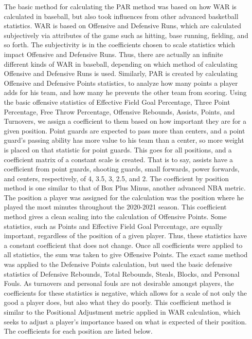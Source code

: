 \documentclass[12pt, titlepage]{article}
\begin{document}
The basic method for calculating the PAR method was based on how WAR is calculated in baseball, but 
also took influences from other advanced basketball statistics. WAR is based on Offensive and Defensive 
Runs, which are calculated subjectively via attributes of the game such as hitting, base running, fielding, 
and so forth. The subjectivity is in the coefficients chosen to scale statistics which impact Offensive and 
Defensive Runs. Thus, there are actually an infinite different kinds of WAR in baseball, depending on which 
method of calculating Offensive and Defensive Runs is used. Similarly, PAR is created by calculating 
Offensive and Defensive Points statistics, to analyze how many points a player adds for his team, and how 
many he prevents the other team from scoring. Using the basic offensive statistics of Effective Field Goal 
Percentage, Three Point Percentage, Free Throw Percentage, Offensive Rebounds, Assists, Points, and 
Turnovers, we assign a coefficient to them based on how important they are for a given position. Point 
guards are expected to pass more than centers, and a point guard's passing ability has more value to his 
team than a center, so more weight is placed on that statistic for point guards. This goes for all positions, 
and a coefficient matrix of a constant scale is created. That is to say, assists have a coefficient from point 
guards, shooting guards, small forwards, power forwards, and centers, respectively, of 4, 3.5, 3, 2.5, and 2. 
The coefficient by position method is one similar to that of Box Plus Minus, another advanced NBA metric. 
The position a player was assigned for the calculation was the position where he played the most minutes 
throughout the 2020-2021 season. This coefficient method gives a clean scaling into the calculation of 
Offensive Points. Some statistics, such as Points and Effective Field Goal Percentage, are equally 
important, regardless of the position of a given player. Thus, these statistics have a constant coefficient that 
does not change. Once all coefficients were applied to all statistics, the sum was taken to give Offensive 
Points. The exact same method was applied to the Defensive Points calculation, but used the basic 
defensive statistics of Defensive Rebounds, Total Rebounds, Steals, Blocks, and Personal Fouls. As 
turnovers and personal fouls are not desirable amongst players, the coefficients for these statistics is 
negative, which allows for a scale of not only the good a player does, but also what they do poorly. This 
coefficient method is similar to the Positional Adjustment metric applied in WAR calculation, which seeks to 
adjust a player's importance based on what is expected of their position. The coefficients for each position are listed below.
\end{document}
